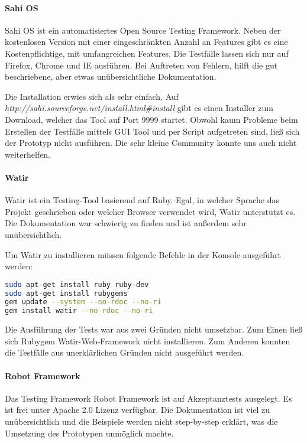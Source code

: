 \paragraph{Sahi OS}
Sahi OS ist ein automatisiertes Open Source Testing Framework. Neben der kostenlosen Version mit einer eingeschränkten Anzahl an Features gibt es eine Kostenpflichtige, mit umfangreichen Features. Die Testfälle lassen sich nur auf Firefox, Chrome und IE ausführen. Bei Auftreten von Fehlern, hilft die gut beschriebene, aber etwas unübersichtliche Dokumentation.

Die Installation erwies sich als sehr einfach. Auf \textit{http://sahi.sourceforge.net/install.html\#install} gibt es einen Installer zum Download, welcher das Tool auf Port 9999 startet. Obwohl kaum Probleme beim Erstellen der Testfälle mittels GUI Tool und per Script aufgetreten sind, ließ sich der Prototyp nicht ausführen. Die sehr kleine Community konnte uns auch nicht weiterhelfen.

\paragraph{Watir}
Watir ist ein Testing-Tool basierend auf Ruby. Egal, in welcher Sprache das Projekt geschrieben oder welcher Browser verwendet wird, Watir unterstützt es.\\
Die Dokumentation war schwierig zu finden und ist außerdem sehr unübersichtlich. \cite{WATIR}

Um Watir zu installieren müssen folgende Befehle in der Konsole ausgeführt werden: 
\begin{lstlisting}[caption={Installation von Watir \cite{WATIRINSTALL}}, language=bash]
sudo apt-get install ruby ruby-dev
sudo apt-get install rubygems
gem update --system --no-rdoc --no-ri
gem install watir --no-rdoc --no-ri
\end{lstlisting}


Die Ausführung der Tests war aus zwei Gründen nicht umsetzbar. Zum Einen ließ sich Rubygem Watir-Web-Framework nicht installieren. Zum Anderen konnten die Testfälle aus unerklärlichen Gründen nicht ausgeführt werden.

\paragraph{Robot Framework}
Das Testing Framework Robot Framework ist auf Akzeptanztests ausgelegt. Es ist frei unter Apache 2.0 Lizenz verfügbar. Die Dokumentation ist viel zu unübersichtlich und die Beispiele werden nicht step-by-step erklärt, was die Umsetzung des Prototypen unmöglich machte. \cite{ROBOTFRAMEWORK}

